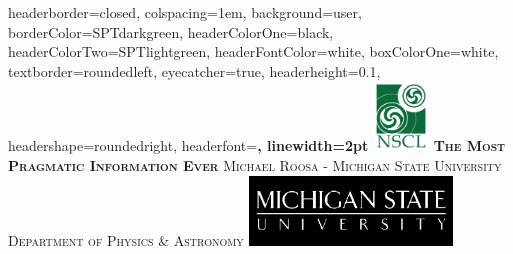 \documentclass[landscape,a0paper,fontscale=0.28]{baposter} %
\begin{document}
\begin{poster}
{
headerborder=closed, %
colspacing=1em, %
background=user,
borderColor=SPTdarkgreen, %
headerColorOne=black, %
headerColorTwo=SPTlightgreen, %
headerFontColor=white, %
boxColorOne=white, %
textborder=roundedleft, %
eyecatcher=true, %
headerheight=0.1\textheight, %
headershape=roundedright, %
headerfont=\Large\bf\textsc, %
linewidth=2pt %
}
%
{\includegraphics[height=5em]{nscl.png}} %
{\bf\textsc{The Most Pragmatic Information Ever}\vspace{0.5em}} %
{\textsc{Michael Roosa -  \hspace{12pt} Michigan State University \\ Department of Physics \& Astronomy}} %
{\includegraphics[height=5em]{msublk.png}} %


\end{poster}
\end{document}
